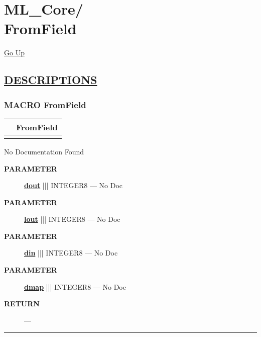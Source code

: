 \chapter*{\color{headfile}
{\large ML\_Core\slash\hspace{0pt}}
 \\
FromField
}
\hypertarget{ecldoc:toc:ML_Core.FromField}{}
\hyperlink{ecldoc:toc:root/ML_Core}{Go Up}


\section*{\underline{\textsf{DESCRIPTIONS}}}
\subsection*{\textsf{\colorbox{headtoc}{\color{white} MACRO}
FromField}}

\hypertarget{ecldoc:ml_core.fromfield}{}

{\renewcommand{\arraystretch}{1.5}
\begin{tabularx}{\textwidth}{|>{\raggedright\arraybackslash}l|X|}
\hline
\hspace{0pt}\mytexttt{\color{red} } & \textbf{FromField} \\
\hline
\multicolumn{2}{|>{\raggedright\arraybackslash}X|}{\hspace{0pt}\mytexttt{\color{param} (dIn,lOut,dOut,dMap='')}} \\
\hline
\end{tabularx}
}

\par





No Documentation Found






\par
\begin{description}
\item [\colorbox{tagtype}{\color{white} \textbf{\textsf{PARAMETER}}}] \textbf{\underline{dout}} ||| INTEGER8 --- No Doc
\item [\colorbox{tagtype}{\color{white} \textbf{\textsf{PARAMETER}}}] \textbf{\underline{lout}} ||| INTEGER8 --- No Doc
\item [\colorbox{tagtype}{\color{white} \textbf{\textsf{PARAMETER}}}] \textbf{\underline{din}} ||| INTEGER8 --- No Doc
\item [\colorbox{tagtype}{\color{white} \textbf{\textsf{PARAMETER}}}] \textbf{\underline{dmap}} ||| INTEGER8 --- No Doc
\end{description}







\par
\begin{description}
\item [\colorbox{tagtype}{\color{white} \textbf{\textsf{RETURN}}}] \textbf{} --- 
\end{description}




\rule{\linewidth}{0.5pt}

